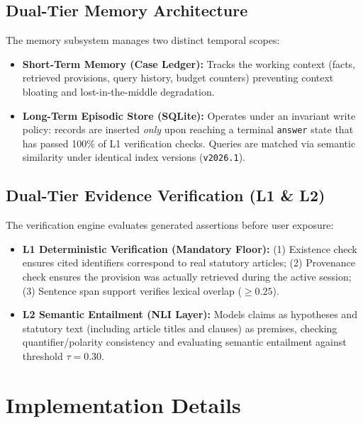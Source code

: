 \documentclass[a4paper,11pt]{article}
\begin{document}
\subsection{Dual-Tier Memory Architecture}
The memory subsystem manages two distinct temporal scopes:
\begin{itemize}[leftmargin=14pt,noitemsep]
    \item \textbf{Short-Term Memory (Case Ledger):} Tracks the working context (facts, retrieved provisions, query history, budget counters) preventing context bloating and lost-in-the-middle degradation.
    \item \textbf{Long-Term Episodic Store (SQLite):} Operates under an invariant write policy: records are inserted \textit{only} upon reaching a terminal \texttt{answer} state that has passed 100\% of L1 verification checks. Queries are matched via semantic similarity under identical index versions (\texttt{v2026.1}).
\end{itemize}

\subsection{Dual-Tier Evidence Verification (L1 \& L2)}
The verification engine evaluates generated assertions before user exposure:
\begin{itemize}[leftmargin=14pt,noitemsep]
    \item \textbf{L1 Deterministic Verification (Mandatory Floor):} (1) Existence check ensures cited identifiers correspond to real statutory articles; (2) Provenance check ensures the provision was actually retrieved during the active session; (3) Sentence span support verifies lexical overlap ($\ge 0.25$).
    \item \textbf{L2 Semantic Entailment (NLI Layer):} Models claims as hypotheses and statutory text (including article titles and clauses) as premises, checking quantifier/polarity consistency and evaluating semantic entailment against threshold $\tau = 0.30$.
\end{itemize}

\section{Implementation Details}
\end{document}
